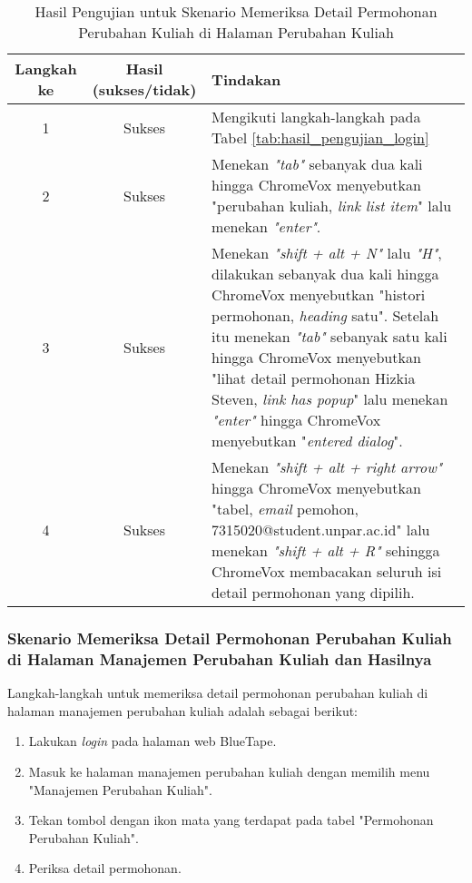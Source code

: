 \begin{table}[H]
    \centering 
    \caption{Hasil Pengujian untuk Skenario Memeriksa Detail Permohonan Perubahan Kuliah di Halaman Perubahan Kuliah}
    \label{tab:hasil_pengujian_memeriksa_detail_permohonan_perubahan_kuliah_di_halaman_perubahan_kuliah}
    \begin{tabular}{|c|c|p{10cm}|}
        \toprule
        Langkah ke & Hasil (sukses/tidak) & Tindakan \\

        \midrule
        1 & Sukses & Mengikuti langkah-langkah pada Tabel \ref{tab:hasil_pengujian_login} \\
        2 & Sukses & Menekan \textit{"tab"} sebanyak dua kali hingga ChromeVox menyebutkan "perubahan kuliah, \textit{link list item}" lalu menekan \textit{"enter"}. \\
        3 & Sukses & Menekan \textit{"shift + alt + N"} lalu \textit{"H"}, dilakukan sebanyak dua kali hingga ChromeVox menyebutkan "histori permohonan, \textit{heading} satu". Setelah itu menekan \textit{"tab"} sebanyak satu kali hingga ChromeVox menyebutkan "lihat detail permohonan Hizkia Steven, \textit{link has popup}" lalu menekan \textit{"enter"} hingga ChromeVox menyebutkan "\textit{entered dialog}". \\
        4 & Sukses & Menekan \textit{"shift + alt + right arrow"} hingga ChromeVox menyebutkan "tabel, \textit{email} pemohon, 7315020@student.unpar.ac.id" lalu menekan \textit{"shift + alt + R"} sehingga ChromeVox membacakan seluruh isi detail permohonan yang dipilih. \\

        \bottomrule

    \end{tabular}
\end{table}

\subsubsection{Skenario Memeriksa Detail Permohonan Perubahan Kuliah di Halaman Manajemen Perubahan Kuliah dan Hasilnya}
\label{subsubsec:skenario_memeriksa_detail_permohonan_perubahan_kuliah_di_halaman_manajemen_perubahan_kuliah}
Langkah-langkah untuk memeriksa detail permohonan perubahan kuliah di halaman manajemen perubahan kuliah adalah sebagai berikut:

\begin{enumerate}
    \item Lakukan \textit{login} pada halaman web BlueTape.
    \item Masuk ke halaman manajemen perubahan kuliah dengan memilih menu "Manajemen Perubahan Kuliah".
    \item Tekan tombol dengan ikon mata yang terdapat pada tabel "Permohonan Perubahan Kuliah".
    \item Periksa detail permohonan.
\end{enumerate}

